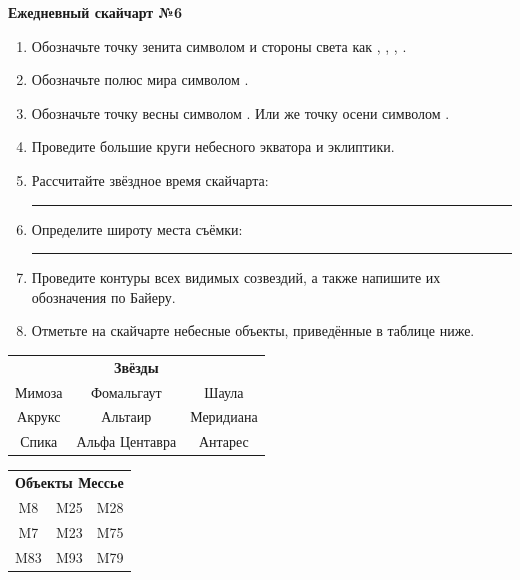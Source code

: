 \documentclass{./SAS-class-skygen}
\begin{document}
    
    
    
	\begin{center}
		\large\textbf{Ежедневный скайчарт №6}
	\end{center}

	\begin{enumerate}
		\item Обозначьте точку зенита символом  и стороны света как , , , .
		\item Обозначьте полюс мира символом .
		\item Обозначьте точку весны символом \Aries. Или же точку осени символом \Libra.
		\item Проведите большие круги небесного экватора и эклиптики.
		\item Рассчитайте звёздное время скайчарта: \rule{2cm}{0.4pt}
		\item Определите широту места съёмки: \rule{2cm}{0.4pt}
		\item Проведите контуры всех видимых созвездий, а также напишите их обозначения по Байеру.
		\item Отметьте на скайчарте небесные объекты, приведённые в таблице ниже.
	\end{enumerate}
	
    \vspace{0.5cm}

    \begin{table}[h!]
    \centering
    \begin{tabular}{ccc}
    \multicolumn{3}{c}{\textbf{Звёзды}} \\ Мимоза & Фомальгаут & Шаула \\
Акрукс & Альтаир & Меридиана \\
Спика & Альфа Центавра & Антарес \\

\end{tabular}
    \hfill
    \begin{tabular}{ccc}
    \multicolumn{3}{c}{\textbf{Объекты Мессье}} \\ M8 & M25 & M28 \\
M7 & M23 & M75 \\
M83 & M93 & M79 \\

\end{tabular}
    \end{table}
	
\end{document}
